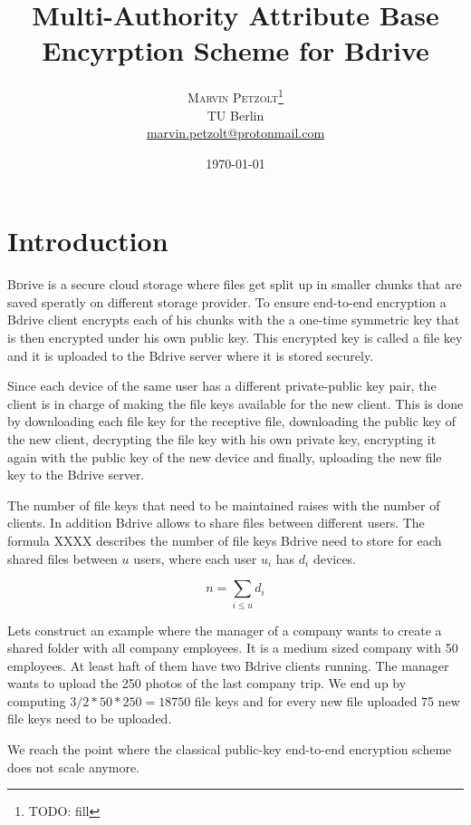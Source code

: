 \documentclass[twocolumn]{article}
\title{Multi-Authority Attribute Base Encyrption Scheme for Bdrive } %
\author{%
\textsc{Marvin Petzolt}\thanks{TODO: fill} \\[1ex] %
\normalsize TU Berlin \\ %
\normalsize \href{mailto:marvin.petzolt@protonmail.com}{marvin.petzolt@protonmail.com} %
}
\date{\today} %
\begin{document}
\twocolumn[
    \maketitle
]



\section{Introduction}

\lettrine[nindent=0em,lines=3]{B}
drive is a secure cloud storage where files get split up in smaller chunks that are saved speratly on different storage provider. To ensure end-to-end encryption a Bdrive client encrypts each of his chunks with the a one-time symmetric key that is then encrypted under his own public key. This encrypted key is called a file key and it is uploaded to the Bdrive server where it is stored securely. 

Since each device of the same user has a different private-public key pair, the client is in charge of making the file keys available for the new client. This is done by downloading each file key for the receptive file, downloading the public key of the new client, decrypting the file key with his own private key, encrypting it again with the public key of the new device and finally, uploading the new file key to the Bdrive server.

The number of file keys that need to be maintained raises with the number of clients. In addition Bdrive allows to share files between different users. The formula XXXX describes the number of file keys Bdrive need to store for each shared files between $u$ users, where each user $u_i$ has $d_i$ devices.

$$
n = \sum_{i \le u}{d_i} 
$$

Lets construct an example where the manager of a company wants to create a shared folder with all company employees. It is a medium sized company with 50 employees. At least haft of them have two Bdrive clients running. The manager wants to upload the 250 photos of the last company trip.
We end up by computing $3/2 * 50 * 250 = 18750$ file keys and for every new file uploaded 75 new file keys need to be uploaded. 

We reach the point where the classical public-key end-to-end encryption scheme does not scale anymore. 
\end{document}
